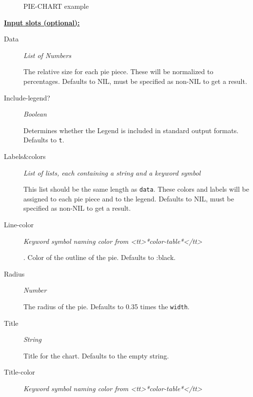 \documentclass [11pt]{book}
\begin{document}
\begin{itemize}
\begin{figure}
\caption{PIE-CHART example}

\label{fig:PIE-CHART}

\end{figure}





\textbf{
\underline{Input slots (optional):}}

\begin{description}

\item [Data]
\emph{List of Numbers}

 The relative size for each pie piece. These will be normalized to percentages.
Defaults to NIL, must be specified as non-NIL to get a result.




\item [Include-legend?]
\emph{Boolean}

 Determines whether the Legend is included in standard output formats. Defaults to \texttt{t}.




\item [Labels&colors]
\emph{List of lists, each containing a string and a keyword symbol}

 This list should be the same
length as \texttt{data}. These colors and labels will be assigned to each pie piece and to the legend.
Defaults to NIL, must be specified as non-NIL to get a result.




\item [Line-color]
\emph{Keyword symbol naming color from <tt>*color-table*</tt>}

.
Color of the outline of the pie. Defaults to :black.




\item [Radius]
\emph{Number}

 The radius of the pie. Defaults to 0.35 times the \texttt{width}.




\item [Title]
\emph{String}

 Title for the chart. Defaults to the empty string.




\item [Title-color]
\emph{Keyword symbol naming color from <tt>*color-table*</tt>}


\end{description}
\end{itemize}
\end{document}
